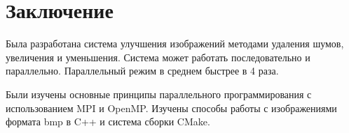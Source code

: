 \section*{Заключение}
Была разработана система улучшения изображений методами удаления шумов, увеличения и уменьшения.
Система может работать последовательно и параллельно.
Параллельный режим в среднем быстрее в 4 раза.

Были изучены основные принципы параллельного программирования с использованием MPI и OpenMP.
Изучены способы работы с изображениями формата bmp в C++ и система сборки CMake.
